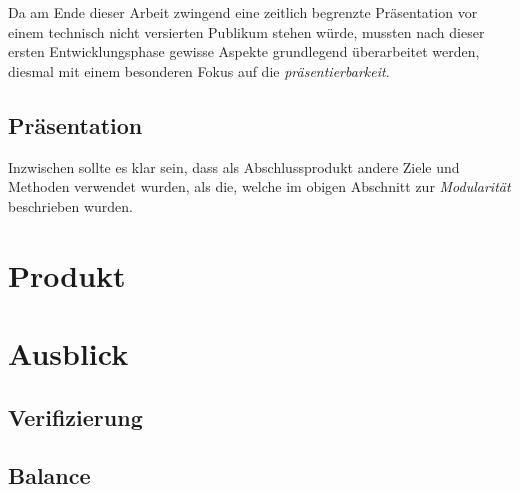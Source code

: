 \documentclass[11pt]{article}
\begin{document}
\noindent Da am Ende dieser Arbeit zwingend eine zeitlich begrenzte
Präsentation vor einem technisch nicht versierten Publikum stehen
würde, mussten nach dieser ersten Entwicklungsphase gewisse Aspekte
grundlegend überarbeitet werden, diesmal mit einem besonderen Fokus
auf die \emph{präsentierbarkeit}.  
\subsection{Präsentation}
\label{sec:org9b6f353}
Inzwischen sollte es klar sein, dass als Abschlussprodukt andere Ziele
und Methoden verwendet wurden, als die, welche im obigen Abschnitt zur
\emph{Modularität} beschrieben wurden.
\section{Produkt}
\label{sec:org89065e5}
\section{Ausblick}
\label{sec:org9b854d9}
\subsection{Verifizierung}
\label{sec:org4c82e5c}
\subsection{Balance}
\label{sec:orgd9f4bac}
\end{document}
